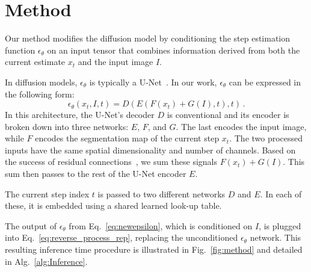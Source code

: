 \documentclass[10pt,twocolumn,letterpaper]{article}
\begin{document}
\section{Method}

Our method modifies the diffusion model by conditioning the step estimation function $\epsilon_\theta$ on an input tensor that combines information derived from both the current estimate $x_t$ and the input image $I$.

In diffusion models, $\epsilon_\theta$ is typically a U-Net~\cite{ronneberger2015u}. In our work, $\epsilon_\theta$ can be expressed in the following form:
\begin{equation}
\label{eq:newepsilon}
    \epsilon_\theta (x_t,I,t) = D(E(F(x_t)+G(I),t),t)\,.
\end{equation}
In this architecture, the U-Net's decoder $D$ is conventional and its encoder is broken down into three networks: $E$, $F$, and $G$. The last encodes the input image, while $F$ encodes the segmentation map of the current step $x_t$. The two processed inputs have the same spatial dimensionality and number of channels. Based on the success of residual connections~\cite{he2016deep}, we sum these signals $F(x_t)+G(I)$. This sum then passes to the rest of the U-Net encoder $E$.

The current step index $t$ is passed to two different networks $D$ and $E$. In each of these, it is embedded using a shared learned look-up table. 

The output of $\epsilon_\theta$ from Eq.~\ref{eq:newepsilon}, which is conditioned on $I$, is plugged into Eq.~\ref{eq:reverse_process_rep}, replacing the unconditioned $\epsilon_\theta$ network. This resulting inference time procedure is illustrated in Fig.~\ref{fig:method} and detailed in Alg.~\ref{alg:Inference}.
\end{document}
